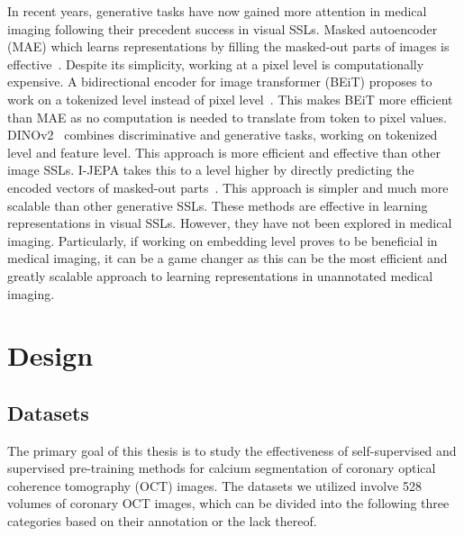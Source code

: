\documentclass[a4paper,11pt,oneside]{report}
\begin{document}
In recent years, generative tasks have now gained more attention in medical imaging following their precedent success in visual SSLs. Masked autoencoder (MAE) which learns representations by filling the masked-out parts of images is effective~\cite{He2022}. Despite its simplicity, working at a pixel level is computationally expensive. A bidirectional encoder for image transformer (BEiT) proposes to work on a tokenized level instead of pixel level~\cite{Bao2022beit}. This makes BEiT more efficient than MAE as no computation is needed to translate from token to pixel values. DINOv2~\cite{Oquab2024dinov} combines discriminative and generative tasks, working on tokenized level and feature level. This approach is more efficient and effective than other image SSLs. I-JEPA takes this to a level higher by directly predicting the encoded vectors of masked-out parts~\cite{Assran2023}. This approach is simpler and much more scalable than other generative SSLs. These methods are effective in learning representations in visual SSLs. However, they have not been explored in medical imaging. Particularly, if working on embedding level proves to be beneficial in medical imaging, it can be a game changer as this can be the most efficient and greatly scalable approach to learning representations in unannotated medical imaging.


\chapter{Design}



\section{Datasets}\label{sec:design:datasets}
The primary goal of this thesis is to study the effectiveness of self-supervised and supervised pre-training methods for calcium segmentation of coronary optical coherence tomography (OCT) images. The datasets we utilized involve 528 volumes of coronary OCT images, which can be divided into the following three categories based on their annotation or the lack thereof. 
\end{document}
